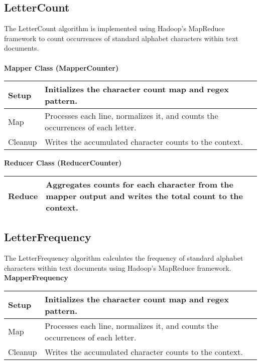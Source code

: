 \subsection{LetterCount}
The LetterCount algorithm is implemented using Hadoop's MapReduce framework to count occurrences of standard alphabet characters within text documents. \\ \\
\textbf{Mapper Class (MapperCounter)}
\begin{longtable}{|>{\raggedright\arraybackslash}p{}|>{\raggedright\arraybackslash}p{}|}
    \hline
    Setup &  Initializes the character count map and regex pattern.\\
    \hline
    Map &  Processes each line, normalizes it, and counts the occurrences of each letter.\\
    \hline
    Cleanup &Writes the accumulated character counts to the context.\\
    \hline
\end{longtable}



\textbf{Reducer Class (ReducerCounter)}
\begin{longtable}{|>{\raggedright\arraybackslash}p{}|>{\raggedright\arraybackslash}p{}|}
    \hline
    Reduce & Aggregates counts for each character from the mapper output and writes the total count to the context. \\
    \hline
\end{longtable}



\subsection{LetterFrequency}

The LetterFrequency algorithm calculates the frequency of standard alphabet characters within text documents using Hadoop's MapReduce framework.\\



\textbf{MapperFrequency}
\begin{longtable}{|>{\raggedright\arraybackslash}p{}|>{\raggedright\arraybackslash}p{}|}
    \hline
    Setup &   Initializes the character count map and regex pattern.\\
    \hline
    Map &  Processes each line, normalizes it, and counts the occurrences of each letter.\\
    \hline
    Cleanup & Writes the accumulated character counts to the context.\\
    \hline
\end{longtable}


